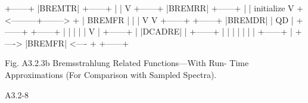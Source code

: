 \begin{center}
\begin{boxedverbatim}




                             +------+
                             |BREMTR|
                             +------+
                                 |
                                 |
                                 V
                             +------+
                             |BREMRR|
                             +------+
                                 |
                                 |
                      initialize V
                     + <---------+--------> +
                     |  BREMFR              |
                     |                      |
                     V                      V
                  +------+              +------+
                  |BREMDR|              |  QD  |
                  +------+              +------+
                     |                      |
                     |                      |
                     |                      V
                     |                  +------+
                     |                  |DCADRE|
                     |                  +------+
                     |                      |
                     |                      |
                     |                      |
                     |       +------+       |
                     + ----> |BREMFR| <---- +
                             +------+


     Fig. A3.2.3b  Bremsstrahlung Related Functions---With Run-
                     Time Approximations (For Comparison
                           with Sampled Spectra).






 A3.2-8
\end{boxedverbatim}
\end{center}
\newpage {}
